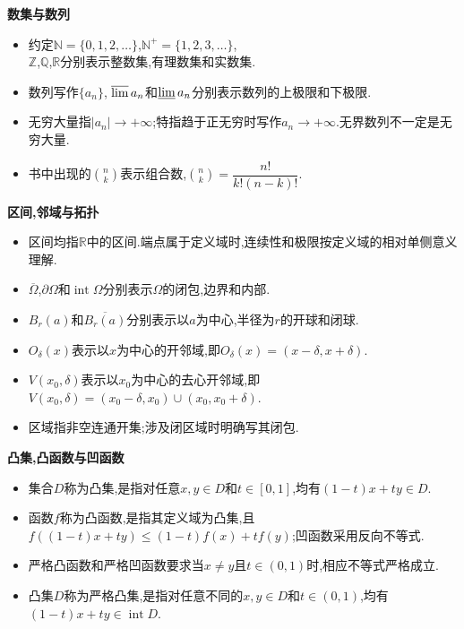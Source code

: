 \documentclass[a4paper,12pt,fleqn,openany,twoside,fontset=windows]{ctexbook}
\begin{document}
\pagestyle{plainnowm}
\begin{booknotelongbody}
\textbf{数集与数列}

\begin{itemize}[leftmargin=2\ccwd,itemsep=0.5em,topsep=0.4em]
    \item 约定$\displaystyle\mathbb{N}=\{0,1,2,\ldots\}$,$\displaystyle\mathbb{N}^+=\{1,2,3,\ldots\}$, \\
    $\displaystyle\mathbb Z$,$\displaystyle\mathbb Q$,$\displaystyle\mathbb R$分别表示整数集,有理数集和实数集.
    \item 数列写作$\displaystyle\{a_n\}$,$\;\displaystyle\varlimsup a_n$和$\displaystyle\varliminf a_n$分别表示数列的上极限和下极限.
    \item 无穷大量指$\displaystyle|a_n|\to+\infty$;特指趋于正无穷时写作$\displaystyle a_n\to+\infty$.无界数列不一定是无穷大量.
    \item 书中出现的$\displaystyle\binom{n}{k}$表示组合数,$\displaystyle\binom{n}{k}=\dfrac{n!}{k!(n-k)!}$.
\end{itemize}

\textbf{区间,邻域与拓扑}

\begin{itemize}[leftmargin=2\ccwd,itemsep=0.5em,topsep=0.4em]
    \item 区间均指$\displaystyle\mathbb R$中的区间.端点属于定义域时,连续性和极限按定义域的相对单侧意义理解.
    \item $\displaystyle\overline\Omega$,$\displaystyle\partial\Omega$和$\displaystyle\operatorname{int}\Omega$分别表示$\displaystyle\Omega$的闭包,边界和内部.
    \item $\displaystyle B_r(a)$和$\displaystyle\overline{B_r(a)}$分别表示以$\displaystyle a$为中心,半径为$\displaystyle r$的开球和闭球.
    \item $O_{\delta}(x)$表示以$x$为中心的开邻域,即$O_{\delta}(x)=(x-\delta,x+\delta)$.
    \item $V(x_0,\delta)$表示以$x_0$为中心的去心开邻域,即$V(x_0,\delta)=(x_0-\delta,x_0)\cup(x_0,x_0+\delta)$.
    \item 区域指非空连通开集;涉及闭区域时明确写其闭包.
\end{itemize}

\textbf{凸集,凸函数与凹函数}

\begin{itemize}[leftmargin=2\ccwd,itemsep=0.5em,topsep=0.4em]
    \item 集合$\displaystyle D$称为凸集,是指对任意$\displaystyle x,y\in D$和$\displaystyle t\in[0,1]$,均有$\displaystyle(1-t)x+ty\in D$.
    \item 函数$\displaystyle f$称为凸函数,是指其定义域为凸集,且$\displaystyle f((1-t)x+ty)\leq(1-t)f(x)+tf(y)$;凹函数采用反向不等式.
    \item 严格凸函数和严格凹函数要求当$\displaystyle x\neq y$且$\displaystyle t\in(0,1)$时,相应不等式严格成立.
    \item 凸集$\displaystyle D$称为严格凸集,是指对任意不同的$\displaystyle x,y\in D$和$\displaystyle t\in(0,1)$,均有$\displaystyle(1-t)x+ty\in\operatorname{int}D$.
\end{itemize}


\end{booknotelongbody}
\end{document}
